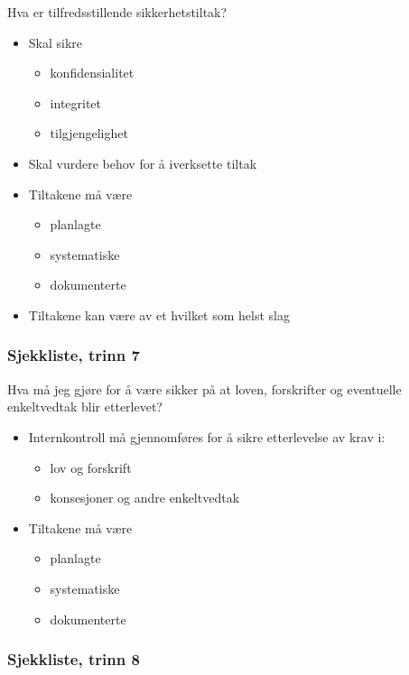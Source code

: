 \documentclass[11pt]{article}
\begin{document}
    Hva er tilfredsstillende sikkerhetstiltak?
\begin{itemize}
\item Skal sikre

\begin{itemize}
\item konfidensialitet
\item integritet
\item tilgjengelighet
\end{itemize}

\item Skal vurdere behov for å iverksette tiltak
\item Tiltakene må være

\begin{itemize}
\item planlagte
\item systematiske
\item dokumenterte
\end{itemize}

\item Tiltakene kan være av et hvilket som helst slag
\end{itemize}
\subsubsection{Sjekkliste, trinn 7}
\label{sec-17.1.7}

    Hva må jeg gjøre for å være sikker på at loven, forskrifter og eventuelle enkeltvedtak blir etterlevet?
\begin{itemize}
\item Internkontroll må gjennomføres for å sikre etterlevelse av krav i:

\begin{itemize}
\item lov og forskrift
\item konsesjoner og andre enkeltvedtak
\end{itemize}

\item Tiltakene må være

\begin{itemize}
\item planlagte
\item systematiske
\item dokumenterte
\end{itemize}

\end{itemize}
\subsubsection{Sjekkliste, trinn 8}
\label{sec-17.1.8}
\end{document}
